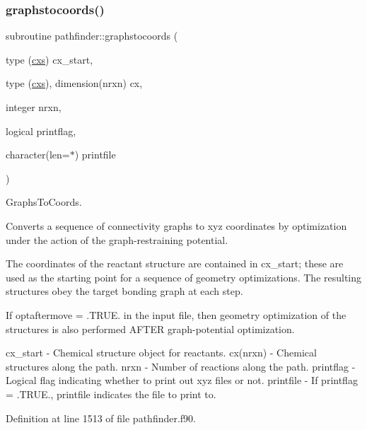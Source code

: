 \subsubsection{\texorpdfstring{graphstocoords()}{graphstocoords()}}
{\footnotesize\ttfamily subroutine pathfinder\+::graphstocoords (\begin{DoxyParamCaption}\item[{type (\mbox{\hyperlink{structchemstr_1_1cxs}{cxs}})}]{cx\+\_\+start,  }\item[{type (\mbox{\hyperlink{structchemstr_1_1cxs}{cxs}}), dimension(nrxn)}]{cx,  }\item[{integer}]{nrxn,  }\item[{logical}]{printflag,  }\item[{character(len=$\ast$)}]{printfile }\end{DoxyParamCaption})}



Graphs\+To\+Coords. 

Converts a sequence of connectivity graphs to xyz coordinates by optimization under the action of the graph-\/restraining potential.

The coordinates of the reactant structure are contained in cx\+\_\+start; these are used as the starting point for a sequence of geometry optimizations. The resulting structures obey the target bonding graph at each step.

If optaftermove = .T\+R\+UE. in the input file, then geometry optimization of the structures is also performed A\+F\+T\+ER graph-\/potential optimization.

cx\+\_\+start -\/ Chemical structure object for reactants. cx(nrxn) -\/ Chemical structures along the path. nrxn -\/ Number of reactions along the path. printflag -\/ Logical flag indicating whether to print out xyz files or not. printfile -\/ If printflag = .T\+R\+UE., printfile indicates the file to print to. 

Definition at line 1513 of file pathfinder.\+f90.

\mbox{\label{namespacepathfinder_a93493afafe94aa6c6c7231b969a5711d}} 
